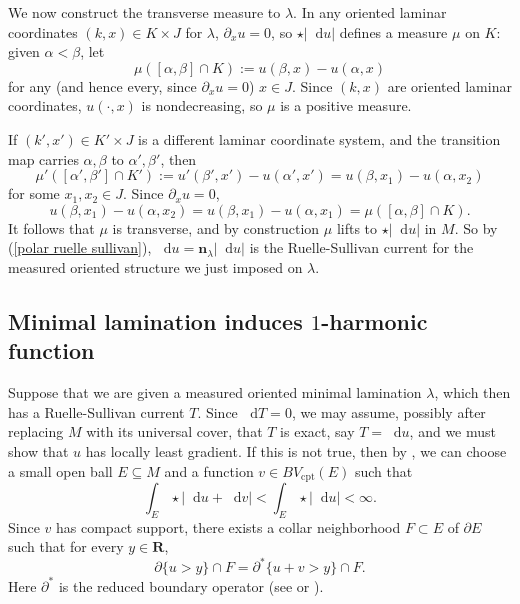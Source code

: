 \documentclass[reqno,11pt]{amsart}
\newcommand{\RR}{\mathbf{R}}
\newcommand*\dif{\mathop{}\!\mathrm{d}}
\newcommand{\normal}{\mathbf n}
\newcommand{\cpt}{\mathrm{cpt}}
\theoremstyle{definition}
\numberwithin{equation}{section}
\begin{document}
We now construct the transverse measure to $\lambda$.
In any oriented laminar coordinates $(k, x) \in K \times J$ for $\lambda$, $\partial_x u = 0$, so $\star |\dif u|$ defines a measure $\mu$ on $K$: given $\alpha < \beta$, let
$$\mu([\alpha, \beta] \cap K) := u(\beta, x) - u(\alpha, x)$$
for any (and hence every, since $\partial_x u = 0$) $x \in J$.
Since $(k, x)$ are oriented laminar coordinates, $u(\cdot, x)$ is nondecreasing, so $\mu$ is a positive measure.

If $(k', x') \in K' \times J$ is a different laminar coordinate system, and the transition map carries $\alpha, \beta$ to $\alpha', \beta'$, then
$$\mu'([\alpha', \beta'] \cap K') := u'(\beta', x') - u(\alpha', x') = u(\beta, x_1) - u(\alpha, x_2)$$
for some $x_1, x_2 \in J$. Since $\partial_x u = 0$,
$$u(\beta, x_1) - u(\alpha, x_2) = u(\beta, x_1) - u(\alpha, x_1) = \mu([\alpha, \beta] \cap K).$$
It follows that $\mu$ is transverse, and by construction $\mu$ lifts to $\star |\dif u|$ in $M$.
So by (\ref{polar ruelle sullivan}), $\dif u = \normal_\lambda |\dif u|$ is the Ruelle-Sullivan current for the measured oriented structure we just imposed on $\lambda$.


\subsection{Minimal lamination induces \texorpdfstring{$1$-harmonic}{one-harmonic} function}
Suppose that we are given a measured oriented minimal lamination $\lambda$, which then has a Ruelle-Sullivan current $T$.
Since $\dif T = 0$, we may assume, possibly after replacing $M$ with its universal cover, that $T$ is exact, say $T = \dif u$, and we must show that $u$ has locally least gradient.
If this is not true, then by \cite[Theorem 2.2]{Sternberg93}, we can choose a small open ball $E \subseteq M$ and a function $v \in BV_\cpt(E)$ such that
$$\int_E \star |\dif u + \dif v| < \int_E \star |\dif u| < \infty.$$
Since $v$ has compact support, there exists a collar neighborhood $F \subset E$ of $\partial E$ such that for every $y \in \RR$,
\begin{equation}\label{collar condition}
	\partial \{u > y\} \cap F = \partial^* \{u + v > y\} \cap F.
\end{equation}
Here $\partial^*$ is the reduced boundary operator (see \cite[Chapter 3]{Giusti77} or \cite[\S2]{BackusFLG}).
\end{document}
